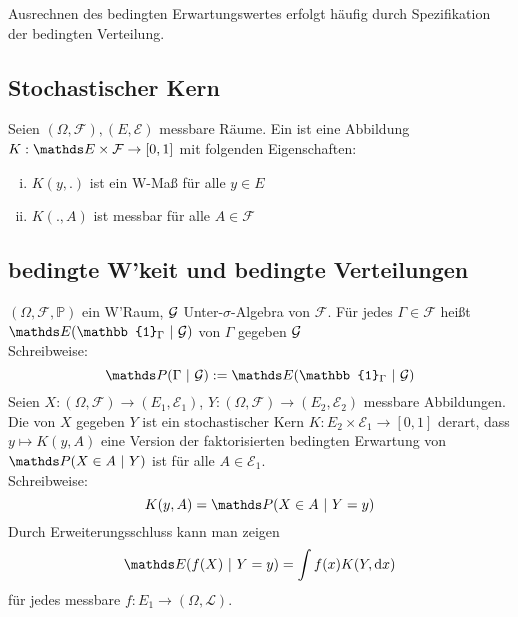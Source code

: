 Ausrechnen des bedingten Erwartungswertes erfolgt häufig durch Spezifikation der bedingten Verteilung.


\subsection{Stochastischer Kern}
\label{sub:stoch_kern}
Seien $(\Omega,\mathcal{F}),(E,\mathcal{E})$ messbare Räume. 
Ein  ist eine Abbildung $K:\E\times \F \to [0,1]$ mit folgenden Eigenschaften:
\begin{enumerate}[(i)]
	\item $K(y,.)$ ist ein W-Maß für alle $y\in E$
	\item $K(.,A)$ ist messbar für alle $A\in \mathcal{F}$
\end{enumerate}


\subsection{bedingte W'keit und bedingte Verteilungen}
\label{sub:bed_wk_vert}
$(\Omega,\mathcal{F},\mathds{P})$ ein W'Raum, $\mathcal{G}$ Unter-$\sigma$-Algebra von $\mathcal{F}$. 
Für jedes $\Gamma\in \mathcal{F}$ heißt $\E(\mathbb{1}_\Gamma~|~\G)$  von $\Gamma$ gegeben $\mathcal{G}$\\
Schreibweise: 
\[
\Pw(\Gamma~|~\G):=\E(\mathbb{1}_\Gamma~|~\G) 
\]
Seien $X:(\Omega,\mathcal{F})\to (E_1,\mathcal{E}_1)$, $Y:(\Omega,\mathcal{F})\to (E_2,\mathcal{E}_2)$ messbare Abbildungen.\\
Die  von $X$ gegeben $Y$ ist ein stochastischer Kern $K:E_2\times \mathcal{E}_1\to [0,1]$ derart, dass $y\mapsto K(y,A)$ eine Version der faktorisierten bedingten Erwartung von $\Pw(X\in A~|~Y)$ ist für alle $A\in\mathcal{E}_1$.\\
Schreibweise: 
\[
K(y,A)=\Pw(X\in A~|~Y=y) 
\]
Durch Erweiterungsschluss kann man zeigen 
\[
\E(f(X)~|~Y=y)= \int f(x) K(Y,\dint x) 
\]
für jedes messbare $f:E_1\to(\Omega,\mathcal{L})$.

